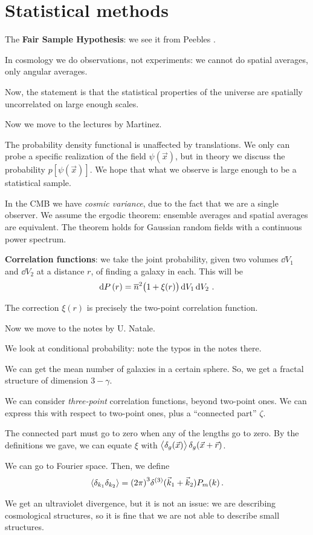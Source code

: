 \documentclass[main.tex]{subfiles}
\begin{document}
\section{Statistical methods}


The \textbf{Fair Sample Hypothesis}: we see it from Peebles \cite[]{peeblesLargescaleStructureUniverse1980}.

In cosmology we do observations, not experiments: we cannot do spatial averages, only angular averages. 

Now, the statement is that the statistical properties of the universe are spatially uncorrelated on large enough scales. 

Now we move to the lectures by Martinez. 

The probability density functional is unaffected by translations.
We only can probe a specific realization of the field \(\psi (\vec{x})\), but in theory we discuss the probability \(p[\psi (\vec{x})]\).
We hope that what we observe is large enough to be a statistical sample. 

In the CMB we have \emph{cosmic variance}, due to the fact that we are a single observer.
We assume the ergodic theorem: ensemble averages and spatial averages are equivalent. 
The theorem holds for Gaussian random fields with a continuous power spectrum. 

\textbf{Correlation functions}: we take the joint probability, given two volumes \(\dd{V_1 }\) and \(\dd{V_2 }\) at a distance \(r\), of finding a galaxy in each. This will be 
%
\begin{align}
\dd{P}(r) = \overline{n}^2 \qty(1 + \xi (r)) \dd{V_1 } \dd{V_2 } 
\,.
\end{align}

The correction \(\xi (r)\) is precisely the two-point correlation function. 

Now we move to the notes by U. Natale. 

We look at conditional probability: note the typos in the notes there. 

We can get the mean number of galaxies in a certain sphere. 
So, we get a fractal structure of dimension \(3 - \gamma \). 

We can consider \emph{three-point} correlation functions, beyond two-point ones. We can express this with respect to two-point ones, plus a ``connected part'' \(\zeta \).

The connected part must go to zero when any of the lengths go to zero. 
By the definitions we gave, we can equate \(\xi \) with  \(\expval{ \delta_g (\vec{x})} \delta_{g} (\vec{x} + \vec{r})\).

We can go to Fourier space. Then, we define 
%
\begin{align}
\expval{ \delta_{k_1 } \delta_{k_2 }} = \qty(2 \pi )^3 
\delta^{(3)} (\vec{k}_{1} + \vec{k}_{2}) P_m (k)
\,.
\end{align}

We get an ultraviolet divergence, but it is not an issue: we are describing cosmological structures, so it is fine that we are not able to describe small structures.
\end{document}
